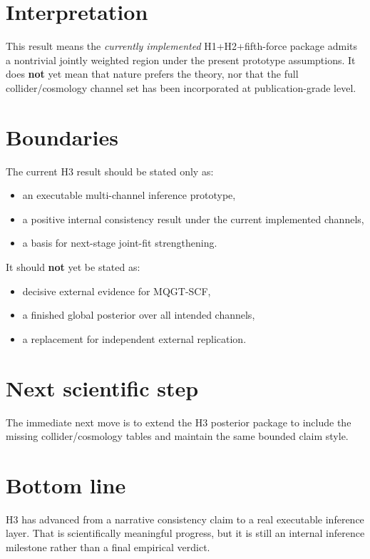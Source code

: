 \documentclass[11pt]{article}
\begin{document}
\section*{Interpretation}
This result means the \emph{currently implemented} H1+H2+fifth-force package admits a nontrivial jointly weighted region under the present prototype assumptions. It does \textbf{not} yet mean that nature prefers the theory, nor that the full collider/cosmology channel set has been incorporated at publication-grade level.

\section*{Boundaries}
The current H3 result should be stated only as:
\begin{itemize}
    \item an executable multi-channel inference prototype,
    \item a positive internal consistency result under the current implemented channels,
    \item a basis for next-stage joint-fit strengthening.
\end{itemize}

It should \textbf{not} yet be stated as:
\begin{itemize}
    \item decisive external evidence for MQGT-SCF,
    \item a finished global posterior over all intended channels,
    \item a replacement for independent external replication.
\end{itemize}

\section*{Next scientific step}
The immediate next move is to extend the H3 posterior package to include the missing collider/cosmology tables and maintain the same bounded claim style.

\section*{Bottom line}
H3 has advanced from a narrative consistency claim to a real executable inference layer. That is scientifically meaningful progress, but it is still an internal inference milestone rather than a final empirical verdict.
\end{document}
